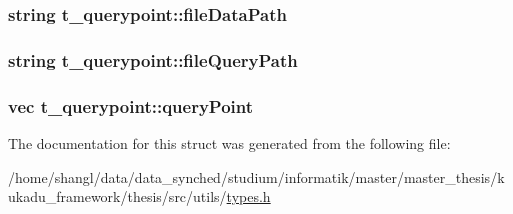 \hypertarget{structt__querypoint_a22c3e798c191b6fd807d7c5db3b0ca40}{
\subsubsection[{file\-Data\-Path}]{\setlength{\rightskip}{0pt plus 5cm}string {\bf t\-\_\-querypoint\-::file\-Data\-Path}}}\label{structt__querypoint_a22c3e798c191b6fd807d7c5db3b0ca40}
\hypertarget{structt__querypoint_a06433d9bd1bff33eff29d440991da6e3}{
\subsubsection[{file\-Query\-Path}]{\setlength{\rightskip}{0pt plus 5cm}string {\bf t\-\_\-querypoint\-::file\-Query\-Path}}}\label{structt__querypoint_a06433d9bd1bff33eff29d440991da6e3}
\hypertarget{structt__querypoint_a7211a8a160d53bf60704f513e5504825}{
\subsubsection[{query\-Point}]{\setlength{\rightskip}{0pt plus 5cm}vec {\bf t\-\_\-querypoint\-::query\-Point}}}\label{structt__querypoint_a7211a8a160d53bf60704f513e5504825}


\-The documentation for this struct was generated from the following file\-:\begin{DoxyCompactItemize}
\item 
/home/shangl/data/data\-\_\-synched/studium/informatik/master/master\-\_\-thesis/kukadu\-\_\-framework/thesis/src/utils/\hyperlink{types_8h}{types.\-h}\end{DoxyCompactItemize}
